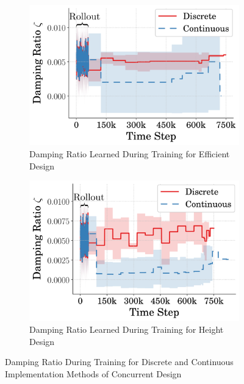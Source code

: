 %  
\begin{figure}[tb!]
  \centering
  \begin{subfigure}{.49\textwidth}
          \centering
          \includegraphics[width=\textwidth]{figures/Ch5/dis_vs_cont/avg_eff_zeta_.png}  
          \caption{Damping Ratio Learned During Training for Efficient Design}
          \label{fig:disc_vs_cont_zeta_eff}
  \end{subfigure}%
  \hfill
  \begin{subfigure}{.49\textwidth}
          \centering
          \includegraphics[width=\textwidth]{figures/Ch5/dis_vs_cont/avg_hei_zeta_.png}  
          \caption{Damping Ratio Learned During Training for Height Design}
          \label{fig:disc_vs_cont_zeta_high}
  \end{subfigure}
   \caption{Damping Ratio During Training for Discrete and Continuous Implementation Methods of Concurrent Design}
   \label{fig:disc_vs_cont_zeta}
\end{figure}
% 

